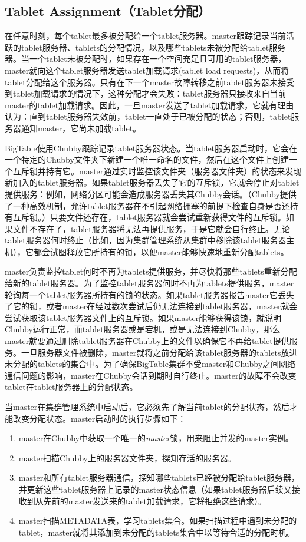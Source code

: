 \documentclass{article}
\begin{document}
\subsection{Tablet Assignment（Tablet分配）}
在任意时刻，每个tablet最多被分配给一个tablet服务器。master跟踪记录当前活跃的tablet服务器、tablets的分配情况，以及哪些tablets未被分配给tablet服务器。当一个tablet未被分配时，如果存在一个空间充足且可用的tablet服务器，master就向这个tablet服务器发送tablet加载请求(tablet load requests)，从而将tablet分配给这个服务器。只有在下一个master故障转移之前tablet服务器未接受到tablet加载请求的情况下，这种分配才会失败：tablet服务器只接收来自当前master的tablet加载请求。因此，一旦master发送了tablet加载请求，它就有理由认为：直到tablet服务器失效前，tablet一直处于已被分配的状态；否则，tablet服务器通知master，它尚未加载tablet。\par
BigTable使用Chubby跟踪记录tablet服务器状态。当tablet服务器启动时，它会在一个特定的Chubby文件夹下新建一个唯一命名的文件，然后在这个文件上创建一个互斥锁并持有它。master通过实时监控该文件夹（服务器文件夹）的状态来发现新加入的tablet服务器。如果tablet服务器丢失了它的互斥锁，它就会停止对tablet提供服务：例如，网络分区可能会造成服务器丢失其Chubby会话。（Chubby提供了一种高效机制，允许tablet服务器在不引起网络拥塞的前提下检查自身是否还持有互斥锁。）只要文件还存在，tablet服务器就会尝试重新获得文件的互斥锁。如果文件不存在了，tablet服务器将无法再提供服务，于是它就会自行终止。无论tablet服务器何时终止（比如，因为集群管理系统从集群中移除该tablet服务器主机），它都会试图释放它所持有的锁，以便master能够快速地重新分配tablets。\par
master负责监控tablet何时不再为tablets提供服务，并尽快将那些tablets重新分配给新的tablet服务器。为了监控tablet服务器何时不再为tablets提供服务，master轮询每一个tablet服务器所持有的锁的状态。如果tablet服务器报告master它丢失了它的锁，或者master在经过数次尝试后仍无法连接到tablet服务器，master就会尝试获取该tablet服务器文件上的互斥锁。如果master能够获得该锁，就说明Chubby运行正常，而tablet服务器或是宕机，或是无法连接到Chubby，那么master就要通过删除tablet服务器在Chubby上的文件以确保它不再给tablet提供服务。一旦服务器文件被删除，master就将之前分配给该tablet服务器的tablets放进未分配的tablets的集合中。为了确保BigTable集群不受master和Chubby之间网络通信问题的影响，master在Chubby会话到期时自行终止。master的故障不会改变tablet在tablet服务器上的分配状态。\par
当master在集群管理系统中启动后，它必须先了解当前tablet的分配状态，然后才能改变分配状态。master启动时的执行步骤如下：
\begin{enumerate}[(1)]
	\item master在Chubby中获取一个唯一的\emph{master}锁，用来阻止并发的master实例。
	\item master扫描Chubby上的服务器文件夹，探知存活的服务器。
	\item master和所有tablet服务器通信，探知哪些tablets已经被分配给tablet服务器，并更新这些tablet服务器上记录的master状态信息（如果tablet服务器后续又接收到从先前的master发送来的tablet加载请求，它将拒绝这些请求）。
	\item master扫描METADATA表，学习tablets集合。如果扫描过程中遇到未分配的tablet，master就将其添加到未分配的tablets集合中以等待合适的分配时机。
\end{enumerate}
\end{document}

